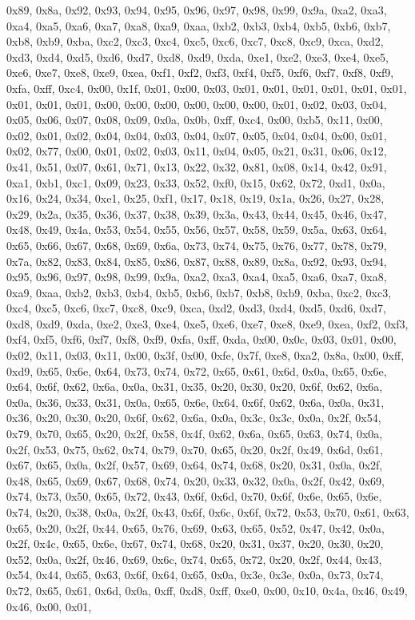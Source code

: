 \documentclass[
]{book}
\begin{document}
0x89, 0x8a, 0x92, 0x93, 0x94, 0x95, 0x96, 0x97, 0x98, 0x99, 0x9a, 0xa2, 0xa3, 0xa4, 0xa5, 0xa6, 0xa7, 0xa8, 0xa9, 0xaa, 0xb2, 0xb3, 0xb4, 0xb5, 0xb6, 0xb7, 0xb8, 0xb9, 0xba, 0xc2, 0xc3, 0xc4, 0xc5, 0xc6, 0xc7, 0xc8, 0xc9, 0xca, 0xd2, 0xd3, 0xd4, 0xd5, 0xd6, 0xd7, 0xd8, 0xd9, 0xda, 0xe1, 0xe2, 0xe3, 0xe4, 0xe5, 0xe6, 0xe7, 0xe8, 0xe9, 0xea, 0xf1, 0xf2, 0xf3, 0xf4, 0xf5, 0xf6, 0xf7, 0xf8, 0xf9, 0xfa, 0xff, 0xc4, 0x00, 0x1f, 0x01, 0x00, 0x03, 0x01, 0x01, 0x01, 0x01, 0x01, 0x01, 0x01, 0x01, 0x01, 0x00,
0x00, 0x00, 0x00, 0x00, 0x00, 0x01, 0x02, 0x03, 0x04, 0x05, 0x06, 0x07, 0x08, 0x09, 0x0a, 0x0b, 0xff, 0xc4, 0x00, 0xb5, 0x11, 0x00, 0x02, 0x01, 0x02, 0x04, 0x04, 0x03, 0x04, 0x07, 0x05, 0x04, 0x04, 0x00, 0x01, 0x02, 0x77, 0x00, 0x01, 0x02, 0x03, 0x11, 0x04, 0x05, 0x21, 0x31, 0x06, 0x12, 0x41, 0x51, 0x07, 0x61, 0x71, 0x13, 0x22, 0x32, 0x81, 0x08, 0x14, 0x42, 0x91, 0xa1, 0xb1, 0xc1, 0x09, 0x23, 0x33, 0x52, 0xf0, 0x15, 0x62, 0x72, 0xd1, 0x0a, 0x16, 0x24, 0x34, 0xe1, 0x25, 0xf1, 0x17, 0x18, 0x19, 0x1a,
0x26, 0x27, 0x28, 0x29, 0x2a, 0x35, 0x36, 0x37, 0x38, 0x39, 0x3a, 0x43, 0x44, 0x45, 0x46, 0x47, 0x48, 0x49, 0x4a, 0x53, 0x54, 0x55, 0x56, 0x57, 0x58, 0x59, 0x5a, 0x63, 0x64, 0x65, 0x66, 0x67, 0x68, 0x69, 0x6a, 0x73, 0x74, 0x75, 0x76, 0x77, 0x78, 0x79, 0x7a, 0x82, 0x83, 0x84, 0x85, 0x86, 0x87, 0x88, 0x89, 0x8a, 0x92, 0x93, 0x94, 0x95, 0x96, 0x97, 0x98, 0x99, 0x9a, 0xa2, 0xa3, 0xa4, 0xa5, 0xa6, 0xa7, 0xa8, 0xa9, 0xaa, 0xb2, 0xb3, 0xb4, 0xb5, 0xb6, 0xb7, 0xb8, 0xb9, 0xba, 0xc2, 0xc3, 0xc4, 0xc5, 0xc6,
0xc7, 0xc8, 0xc9, 0xca, 0xd2, 0xd3, 0xd4, 0xd5, 0xd6, 0xd7, 0xd8, 0xd9, 0xda, 0xe2, 0xe3, 0xe4, 0xe5, 0xe6, 0xe7, 0xe8, 0xe9, 0xea, 0xf2, 0xf3, 0xf4, 0xf5, 0xf6, 0xf7, 0xf8, 0xf9, 0xfa, 0xff, 0xda, 0x00, 0x0c, 0x03, 0x01, 0x00, 0x02, 0x11, 0x03, 0x11, 0x00, 0x3f, 0x00, 0xfe, 0x7f, 0xe8, 0xa2, 0x8a, 0x00, 0xff, 0xd9, 0x65, 0x6e, 0x64, 0x73, 0x74, 0x72, 0x65, 0x61, 0x6d, 0x0a, 0x65, 0x6e, 0x64, 0x6f, 0x62, 0x6a, 0x0a, 0x31, 0x35, 0x20, 0x30, 0x20, 0x6f, 0x62, 0x6a, 0x0a, 0x36, 0x33, 0x31, 0x0a, 0x65,
0x6e, 0x64, 0x6f, 0x62, 0x6a, 0x0a, 0x31, 0x36, 0x20, 0x30, 0x20, 0x6f, 0x62, 0x6a, 0x0a, 0x3c, 0x3c, 0x0a, 0x2f, 0x54, 0x79, 0x70, 0x65, 0x20, 0x2f, 0x58, 0x4f, 0x62, 0x6a, 0x65, 0x63, 0x74, 0x0a, 0x2f, 0x53, 0x75, 0x62, 0x74, 0x79, 0x70, 0x65, 0x20, 0x2f, 0x49, 0x6d, 0x61, 0x67, 0x65, 0x0a, 0x2f, 0x57, 0x69, 0x64, 0x74, 0x68, 0x20, 0x31, 0x0a, 0x2f, 0x48, 0x65, 0x69, 0x67, 0x68, 0x74, 0x20, 0x33, 0x32, 0x0a, 0x2f, 0x42, 0x69, 0x74, 0x73, 0x50, 0x65, 0x72, 0x43, 0x6f, 0x6d, 0x70, 0x6f, 0x6e, 0x65,
0x6e, 0x74, 0x20, 0x38, 0x0a, 0x2f, 0x43, 0x6f, 0x6c, 0x6f, 0x72, 0x53, 0x70, 0x61, 0x63, 0x65, 0x20, 0x2f, 0x44, 0x65, 0x76, 0x69, 0x63, 0x65, 0x52, 0x47, 0x42, 0x0a, 0x2f, 0x4c, 0x65, 0x6e, 0x67, 0x74, 0x68, 0x20, 0x31, 0x37, 0x20, 0x30, 0x20, 0x52, 0x0a, 0x2f, 0x46, 0x69, 0x6c, 0x74, 0x65, 0x72, 0x20, 0x2f, 0x44, 0x43, 0x54, 0x44, 0x65, 0x63, 0x6f, 0x64, 0x65, 0x0a, 0x3e, 0x3e, 0x0a, 0x73, 0x74, 0x72, 0x65, 0x61, 0x6d, 0x0a, 0xff, 0xd8, 0xff, 0xe0, 0x00, 0x10, 0x4a, 0x46, 0x49, 0x46, 0x00, 0x01,
\end{document}
